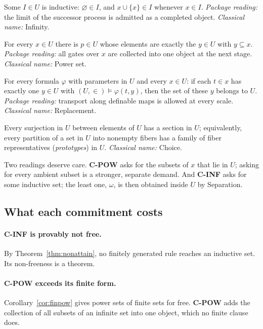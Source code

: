 \begin{description}[leftmargin=1.2em]
\item[\textbf{C-INF} (inductive-stage completion).] Some $I\in U$ is inductive: $\varnothing\in
  I$, and $x\cup\{x\}\in I$ whenever $x\in I$. \emph{Package reading:} the limit of the successor
  process is admitted as a completed object. \emph{Classical name:} Infinity.
\item[\textbf{C-POW} (full subpackage completion).] For every $x\in U$ there is $p\in U$ whose
  elements are exactly the $y\in U$ with $y\subseteq x$. \emph{Package reading:} all gates over
  $x$ are collected into one object at the next stage. \emph{Classical name:} Power set.
\item[\textbf{C-REPL} (unbounded transport).] For every formula $\varphi$ with parameters in $U$
  and every $x\in U$: if each $t\in x$ has exactly one $y\in U$ with $(U,\in)\models\varphi(t,y)$,
  then the set of these $y$ belongs to $U$. \emph{Package reading:} transport along definable maps
  is allowed at every scale. \emph{Classical name:} Replacement.
\item[\textbf{C-SEL} (prototype selection).] Every surjection in $U$ between elements of $U$ has
  a section in $U$; equivalently, every partition of a set in $U$ into nonempty fibers has a
  family of fiber representatives (\emph{prototypes}) in $U$. \emph{Classical name:} Choice.
\end{description}

Two readings deserve care. \textbf{C-POW} asks for the subsets of $x$ that lie in $U$; asking for
every ambient subset is a stronger, separate demand. And \textbf{C-INF} asks for some inductive
set; the least one, $\omega$, is then obtained inside $U$ by Separation.

\subsection{What each commitment costs}

\paragraph{C-INF is provably not free.} By Theorem~\ref{thm:nonattain}, no finitely generated
rule reaches an inductive set. Its non-freeness is a theorem.

\paragraph{C-POW exceeds its finite form.} Corollary~\ref{cor:finpow} gives power sets of finite
sets for free. \textbf{C-POW} adds the collection of all subsets of an infinite set into one
object, which no finite clause does.

